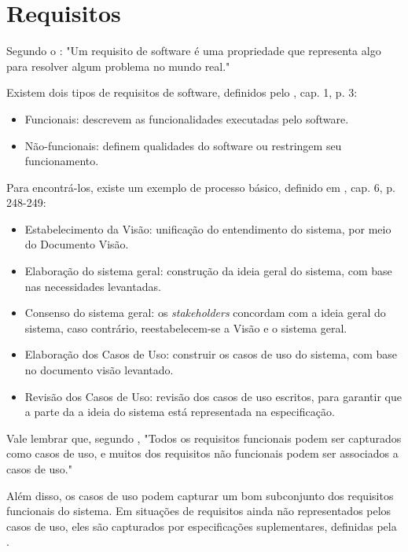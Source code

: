 \section{Requisitos}
Segundo o \citeauthor{ieeecomputersociety2014}: "Um requisito de software é uma propriedade que representa algo para resolver algum problema no mundo real."

Existem dois tipos de requisitos de software, definidos pelo \citeauthor{ieeecomputersociety2014}, cap. 1, p. 3:

\begin{itemize}
    \item Funcionais: descrevem as funcionalidades executadas pelo software.
    \item Não-funcionais: definem qualidades do software ou restringem seu funcionamento.
\end{itemize}

Para encontrá-los, existe um exemplo de processo básico, definido em \citeauthor{kurtbittnerianspence2002} \citeyear{kurtbittnerianspence2002}, cap. 6, p. 248-249:

\begin{itemize}
    \item Estabelecimento da Visão: unificação do entendimento do sistema, por meio do Documento Visão.
    \item Elaboração do sistema geral: construção da ideia geral do sistema, com base nas necessidades levantadas.
    \item Consenso do sistema geral: os \textit{stakeholders} concordam com a ideia geral do sistema, caso contrário, reestabelecem-se a Visão e o sistema geral.
    \item Elaboração dos Casos de Uso: construir os casos de uso do sistema, com base no documento visão levantado.
    \item Revisão dos Casos de Uso: revisão dos casos de uso escritos, para garantir que a parte da a ideia do sistema está representada na especificação.
\end{itemize}

Vale lembrar que, segundo \citeauthor{kurtbittnerianspence2002}, "Todos os requisitos funcionais podem ser capturados como casos de uso, e muitos dos requisitos não funcionais podem ser associados a casos de uso."

Além disso, os casos de uso podem capturar um bom subconjunto dos requisitos funcionais do sistema. Em situações de requisitos ainda não representados pelos casos de uso, eles são capturados por especificações suplementares, definidas pela \citeauthor{ibm2011}\cite[cap. ~1, p. ~23]{kurtbittnerianspence2002}.

